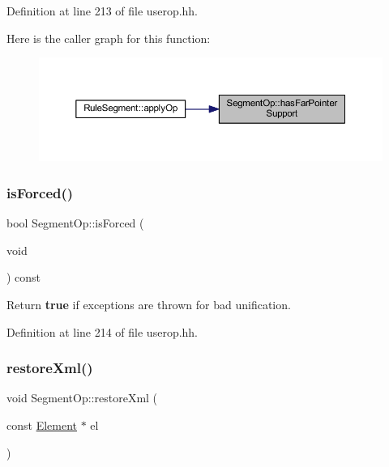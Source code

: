 Definition at line 213 of file userop.\+hh.

Here is the caller graph for this function\+:
\nopagebreak
\begin{figure}[H]
\begin{center}
\leavevmode
\includegraphics[width=350pt]{class_segment_op_adeed973d1e49c68202121f4173150e31_icgraph}
\end{center}
\end{figure}
\mbox{\label{class_segment_op_aacb606ca438d1a660222777c04d25d84}} 
\subsubsection{\texorpdfstring{isForced()}{isForced()}}
{\footnotesize\ttfamily bool Segment\+Op\+::is\+Forced (\begin{DoxyParamCaption}\item[{void}]{ }\end{DoxyParamCaption}) const\hspace{0.3cm}{\ttfamily [inline]}}



Return {\bfseries{true}} if exceptions are thrown for bad unification. 



Definition at line 214 of file userop.\+hh.

\mbox{\label{class_segment_op_a6f311b351e8d30119469650d5e33f84b}} 
\subsubsection{\texorpdfstring{restoreXml()}{restoreXml()}}
{\footnotesize\ttfamily void Segment\+Op\+::restore\+Xml (\begin{DoxyParamCaption}\item[{const \mbox{\hyperlink{class_element}{Element}} $\ast$}]{el }\end{DoxyParamCaption})\hspace{0.3cm}{\ttfamily [virtual]}}



